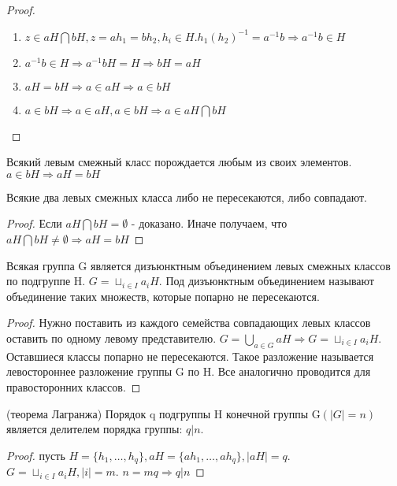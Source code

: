 \begin{proof}
	\begin{enumerate}
		\item \(z\in aH\bigcap bH, z= ah_1 = bh_2, h_i \in H. h_1(h_2)^{-1}=a^{-1}b \Longrightarrow a^{-1}b\in H \)
		\item \(a^{-1}b\in H \Longrightarrow a^{-1}bH = H \Longrightarrow bH = aH\)
		\item \(aH = bH \Longrightarrow a\in aH \Longrightarrow a\in bH\)
		\item \(a\in bH \Longrightarrow a\in aH, a\in bH \Longrightarrow a\in aH\bigcap bH\)
	\end{enumerate}
\end{proof}
\begin{corollary}
	Всякий левым смежный класс порождается любым из своих элементов. \(a\in bH \Longrightarrow aH = bH\)
\end{corollary}
\begin{corollary}
	Всякие два левых смежных класса либо не пересекаются, либо совпадают.
\end{corollary}
\begin{proof}
	Если \(aH\bigcap bH = \emptyset\) - доказано. Иначе получаем, что \(aH\bigcap bH \ne \emptyset \Longrightarrow aH = bH\)
\end{proof}
\begin{corollary}
	Всякая группа G является дизъюнктным объединением левых смежных классов по подгруппе H. \(G = \sqcup_{i\in I} a_iH \). Под дизъюнктным объединением называют объединение таких множеств, которые попарно не пересекаются.
\end{corollary}
\begin{proof}
	Нужно поставить из каждого семейства совпадающих левых классов оставить по одному левому представителю. \(G = \bigcup_{a\in G} aH \Longrightarrow G = \sqcup_{i\in I} a_iH\). Оставшиеся классы попарно не пересекаются. Такое разложение называется левостороннее разложение группы G по H. Все аналогично проводится для правосторонних классов.
\end{proof}
\begin{theorem}
	(теорема Лагранжа) \newline
	Порядок q подгруппы H конечной группы G\((|G| = n)\) является делителем порядка группы: \(q|n\).
\end{theorem}
\begin{proof}
	пусть \(H = \{h_1, \ldots, h_q\}, aH = \{ah_1, \ldots, ah_q\}, |aH| = q\). \(G = \sqcup_{i\in I} a_iH, |i| = m\). \(n = mq \Longrightarrow q|n\)
\end{proof}
